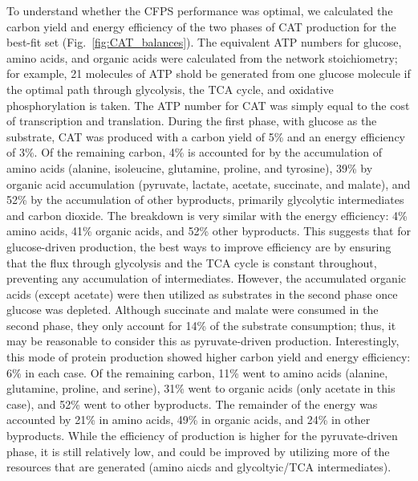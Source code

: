 \documentclass[12pt]{article}
\begin{document}
To understand whether the CFPS performance was optimal, we calculated the carbon yield and energy efficiency of the two phases of CAT production for the best-fit set (Fig.~\ref{fig:CAT_balances}).
The equivalent ATP numbers for glucose, amino acids, and organic acids were calculated from the network stoichiometry; for example, 21 molecules of ATP shold be generated from one glucose molecule if the optimal path through glycolysis, the TCA cycle, and oxidative phosphorylation is taken.
The ATP number for CAT was simply equal to the cost of transcription and translation.
During the first phase, with glucose as the substrate, CAT was produced with a carbon yield of 5\% and an energy efficiency of 3\%.
Of the remaining carbon, 4\% is accounted for by the accumulation of amino acids (alanine, isoleucine, glutamine, proline, and tyrosine), 39\% by organic acid accumulation (pyruvate, lactate, acetate, succinate, and malate), and 52\% by the accumulation of other byproducts, primarily glycolytic intermediates and carbon dioxide.
The breakdown is very similar with the energy efficiency: 4\% amino acids, 41\% organic acids, and 52\% other byproducts.
This suggests that for glucose-driven production, the best ways to improve efficiency are by ensuring that the flux through glycolysis and the TCA cycle is constant throughout, preventing any accumulation of intermediates.
However, the accumulated organic acids (except acetate) were then utilized as substrates in the second phase once glucose was depleted.
Although succinate and malate were consumed in the second phase, they only account for 14\% of the substrate consumption; thus, it may be reasonable to consider this as pyruvate-driven production.
Interestingly, this mode of protein production showed higher carbon yield and energy efficiency: 6\% in each case.
Of the remaining carbon, 11\% went to amino acids (alanine, glutamine, proline, and serine), 31\% went to organic acids (only acetate in this case), and 52\% went to other byproducts.
The remainder of the energy was accounted by 21\% in amino acids, 49\% in organic acids, and 24\% in other byproducts.
While the efficiency of production is higher for the pyruvate-driven phase, it is still relatively low, and could be improved by utilizing more of the resources that are generated (amino aicds and glycoltyic\slash TCA intermediates).
\end{document}

